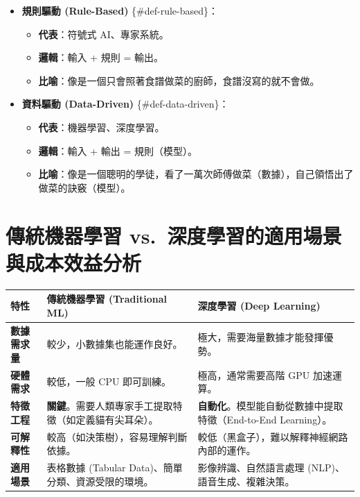 \documentclass[
  letterpaper,
  DIV=11,
  numbers=noendperiod]{scrreprt}
\providecommand{\tightlist}{%
  \setlength{\itemsep}{0pt}\setlength{\parskip}{0pt}}
\begin{document}
\begin{itemize}
\tightlist
\item
  \textbf{規則驅動 (Rule-Based)} \{\#def-rule-based\}：

  \begin{itemize}
  \tightlist
  \item
    \textbf{代表}：符號式 AI、專家系統。
  \item
    \textbf{邏輯}：輸入 + 規則 = 輸出。
  \item
    \textbf{比喻}：像是一個只會照著食譜做菜的廚師，食譜沒寫的就不會做。
  \end{itemize}
\item
  \textbf{資料驅動 (Data-Driven)} \{\#def-data-driven\}：

  \begin{itemize}
  \tightlist
  \item
    \textbf{代表}：機器學習、深度學習。
  \item
    \textbf{邏輯}：輸入 + 輸出 = 規則（模型）。
  \item
    \textbf{比喻}：像是一個聰明的學徒，看了一萬次師傅做菜（數據），自己領悟出了做菜的訣竅（模型）。
  \end{itemize}
\end{itemize}

\section{傳統機器學習
vs.~深度學習的適用場景與成本效益分析}\label{sec-ml-vs-dl-cost}

\begin{longtable}[]{@{}
  >{\raggedright\arraybackslash}p{}
  >{\raggedright\arraybackslash}p{}
  >{\raggedright\arraybackslash}p{}@{}}
\toprule\noalign{}
\begin{minipage}[b]{\linewidth}\raggedright
特性
\end{minipage} & \begin{minipage}[b]{\linewidth}\raggedright
傳統機器學習 (Traditional ML)
\end{minipage} & \begin{minipage}[b]{\linewidth}\raggedright
深度學習 (Deep Learning)
\end{minipage} \\
\midrule\noalign{}
\endhead
\bottomrule\noalign{}
\endlastfoot
\textbf{數據需求量} & 較少，小數據集也能運作良好。 &
極大，需要海量數據才能發揮優勢。 \\
\textbf{硬體需求} & 較低，一般 CPU 即可訓練。 & 極高，通常需要高階 GPU
加速運算。 \\
\textbf{特徵工程} &
\textbf{關鍵}。需要人類專家手工提取特徵（如定義貓有尖耳朵）。 &
\textbf{自動化}。模型能自動從數據中提取特徵（End-to-End Learning）。 \\
\textbf{可解釋性} & 較高（如決策樹），容易理解判斷依據。 &
較低（黑盒子），難以解釋神經網路內部的運作。 \\
\textbf{適用場景} & 表格數據 (Tabular Data)、簡單分類、資源受限的環境。
& 影像辨識、自然語言處理 (NLP)、語音生成、複雜決策。 \\
\end{longtable}
\end{document}
